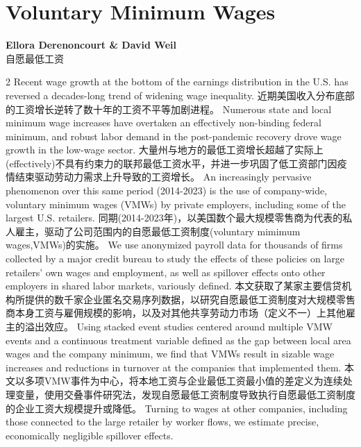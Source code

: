 \documentclass[cn,hazy,blue,14pt,screen]{elegantnote}
\begin{document}
\section{Voluntary Minimum Wages}
\begin{center}
	\textbf{Ellora Derenoncourt \& David Weil}\\
	自愿最低工资
\end{center}
\begin{paracol}{2}
	Recent wage growth at the bottom of the earnings distribution in the U.S. has reversed a decades-long trend of widening wage inequality. 
	\switchcolumn
	近期美国收入分布底部的工资增长逆转了数十年的工资不平等加剧进程。
	\switchcolumn*
	Numerous state and local minimum wage increases have overtaken an effectively non-binding federal minimum, and robust labor demand in the post-pandemic recovery drove wage growth in the low-wage sector. 
	\switchcolumn
	大量州与地方的最低工资增长超越了实际上(effectively)不具有约束力的联邦最低工资水平，并进一步巩固了低工资部门因疫情结束驱动劳动力需求上升导致的工资增长。
	\switchcolumn*
	An increasingly pervasive phenomenon over this same period (2014-2023) is the use of company-wide, voluntary minimum wages (VMWs) by private employers, including some of the largest U.S. retailers. 
	\switchcolumn
	同期(2014-2023年)，以美国数个最大规模零售商为代表的私人雇主，驱动了公司范围内的自愿最低工资制度(voluntary mimimum wages,VMWs)的实施。
	\switchcolumn*
	We use anonymized payroll data for thousands of firms collected by a major credit bureau to study the effects of these policies on large retailers’ own wages and employment, as well as spillover effects onto other employers in shared labor markets, variously defined. 
		\switchcolumn
	本文获取了某家主要信贷机构所提供的数千家企业匿名交易序列数据，以研究自愿最低工资制度对大规模零售商本身工资与雇佣规模的影响，以及对其他共享劳动力市场（定义不一）上其他雇主的溢出效应。
	\switchcolumn*
	Using stacked event studies centered around multiple VMW events and a continuous treatment variable defined as the gap between local area wages and the company minimum, we find that VMWs result in sizable wage increases and reductions in turnover at the companies that implemented them. 
		\switchcolumn
	本文以多项VMW事件为中心，将本地工资与企业最低工资最小值的差定义为连续处理变量，使用交叠事件研究法，发现自愿最低工资制度导致执行自愿最低工资制度的企业工资大规模提升或降低。
	\switchcolumn*
	Turning to wages at other companies, including those connected to the large retailer by worker flows, we estimate precise, economically negligible spillover effects. 

\end{paracol}
\end{document}
